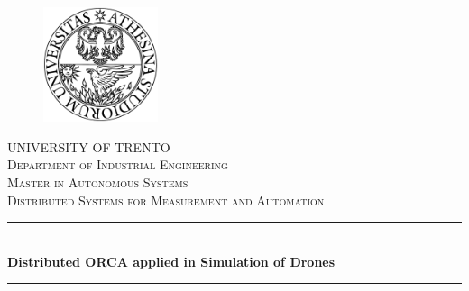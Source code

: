 \documentclass[11pt,twocolumn]{article}
\begin{document}
\begin{titlepage}

\newcommand{\HRule}{\rule{\linewidth}{0.5mm}} %

\center %


\begin{figure}
\centering
\includegraphics[width=0.3\textwidth]{logo.png}
\end{figure} %
 

\textsc{\LARGE UNIVERSITY OF TRENTO}\\[1.3cm] %
\textsc{\Large Department of Industrial Engineering}\\[0.7cm] %
\textsc{\Large Master in Autonomous Systems }\\[0.6cm] %
\textsc{\large Distributed Systems for Measurement and Automation }\\[0.5cm] %


\HRule \\[0.4cm]
{\huge \bfseries Distributed ORCA applied in Simulation of Drones}\\[0.4cm] %
\HRule \\[1.3cm]
 

\end{titlepage}
\end{document}
